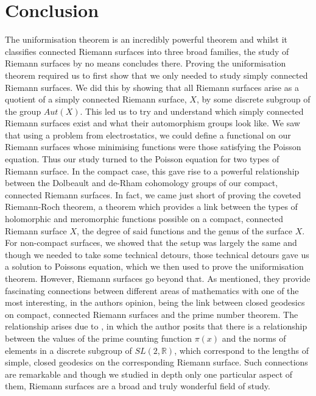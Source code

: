 \documentclass[11pt]{report}
\theoremstyle{definition}
\begin{document}
\chapter*{Conclusion}
The uniformisation theorem is an incredibly powerful theorem and whilst it classifies connected Riemann surfaces into three broad families, the study of Riemann surfaces by no means concludes there. Proving the uniformisation theorem required us to first show that we only needed to study simply connected Riemann surfaces. We did this by showing that all Riemann surfaces arise as a quotient of a simply connected Riemann surface, $X$, by some discrete subgroup of the group $Aut(X)$. This led us to try and understand which simply connected Riemann surfaces exist and what their automorphism groups look like. We saw that using a problem from electrostatics, we could define a functional on our Riemann surfaces whose minimising functions were those satisfying the Poisson equation. Thus our study turned to the Poisson equation for two types of Riemann surface. In the compact case, this gave rise to a powerful relationship between the Dolbeault and de-Rham cohomology groups of our compact, connected Riemann surfaces. In fact, we came just short of proving the coveted Riemann-Roch theorem, a theorem which provides a link between the types of holomorphic and meromorphic functions possible on a compact, connected Riemann surface $X$, the degree of said functions and the genus of the surface $X$. For non-compact surfaces, we showed that the setup was largely the same and though we needed to take some technical detours, those technical detours gave us a solution to Poissons equation, which we then used to prove the uniformisation theorem. However, Riemann surfaces go beyond that. As mentioned, they provide fascinating connections between different areas of mathematics with one of the most interesting, in the authors opinion, being the link between closed geodesics on compact, connected Riemann surfaces and the prime number theorem. The relationship arises due to \cite{selb}, in which the author posits that there is a relationship between the values of the prime counting function $\pi(x)$ and the norms of elements in a discrete subgroup of $SL(2,\mathbb{R})$, which correspond to the lengths of simple, closed geodesics on the corresponding Riemann surface. Such connections are remarkable and though we studied in depth only one particular aspect of them, Riemann surfaces are a broad and truly wonderful field of study.
\end{document}
